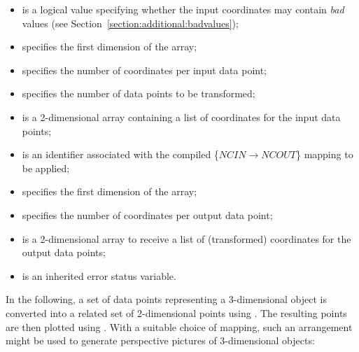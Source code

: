 \begin{itemize}

\item {} is a logical value specifying whether the input 
coordinates may contain {\em bad} values (see 
Section~\ref{section:additional:badvalues});

\item {} specifies the first dimension of the  
array;

\item {} specifies the number of coordinates per input data
point; 

\item {} specifies the number of data points to be transformed;

\item {} is a 2-dimensional array containing a list of
coordinates for the input data points; 

\item {} is an identifier associated with the compiled 
\mbox{\{$NCIN \rightarrow NCOUT$\}} mapping to be applied;

\item {} specifies the first dimension of the  
array;

\item {} specifies the number of coordinates per output data 
point;

\item {} is a 2-dimensional array to receive a list of 
(transformed) coordinates for the output data points; 

\item {} is an inherited error status variable.

\end{itemize}

In the following, a set of data points representing a 3-dimensional object
is converted into a related set of 2-dimensional points using
. 
The resulting points are then plotted using . 
With a suitable choice of mapping, such an arrangement might be used to
generate perspective pictures of 3-dimensional objects: 

